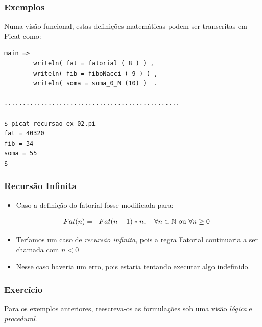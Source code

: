 \begin{frame}[fragile]

\frametitle{Exemplos}

Numa visão funcional, estas definições matemáticas podem ser transcritas em Picat como:

\begin{lstlisting}[frame=single]
main => 
        writeln( fat = fatorial ( 8 ) ) , 
        writeln( fib = fiboNacci ( 9 ) ) ,
        writeln( soma = soma_0_N (10) )  .

................................................

$ picat recursao_ex_02.pi 
fat = 40320
fib = 34
soma = 55
$
\end{lstlisting}

\end{frame}


\begin{frame}[fragile]

\frametitle{Recursão Infinita}

    \begin{itemize}
        \item Caso a definição do fatorial fosse modificada para:
        
        \[
        Fat(n)= 
        \begin{tabular}[c]{ll}
            $Fat(n-1)\ast n$, &$\forall n \in \mathbb{N}$ ou $\forall n \geq 0$
        \end{tabular}
        \]
        \pause
        \item Teríamos um caso de \textit{recursão infinita}, pois a regra Fatorial continuaria
        a ser chamada com $n < 0$
        
        \item Nesse caso haveria um erro, pois estaria tentando executar algo indefinido.
        
    \end{itemize}

\end{frame}



\begin{frame}[fragile]

\frametitle{Exercício}

Para os exemplos anteriores, reescreva-os
as formulações sob uma visão
\textit{lógica} e  \textit{procedural}.

\end{frame}



